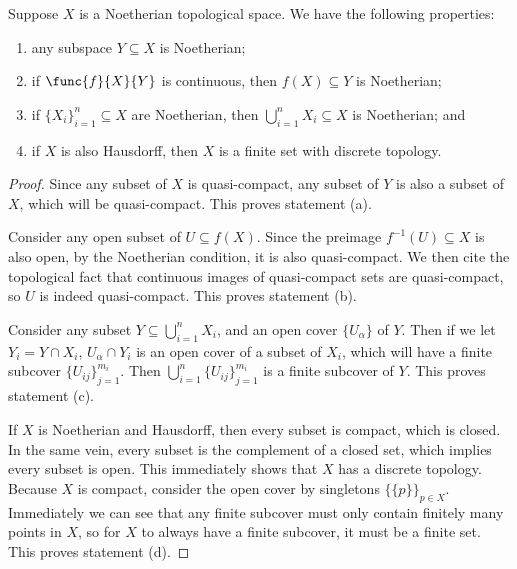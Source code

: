 \begin{proposition}
    Suppose \(X\) is a Noetherian topological space.
    We have the following properties:
    \begin{enumerate}[label={(\alph*)}, itemsep=0mm]
        \item any subspace \(Y \subseteq X\) is Noetherian;
        \item if \(\func{f}{X}{Y}\) is continuous, then \(f(X) \subseteq Y\) is Noetherian;
        \item if \({\{X_i\}}_{i=1}^n \subseteq X\) are Noetherian,
            then \(\bigcup_{i=1}^n X_i \subseteq X\) is Noetherian; and
        \item if \(X\) is also Hausdorff, then \(X\) is a finite set with discrete topology.
    \end{enumerate}
\end{proposition}
\begin{proof}
    Since any subset of \(X\) is quasi-compact,
    any subset of \(Y\) is also a subset of \(X\),
    which will be quasi-compact.
    This proves statement (a).

    Consider any open subset of \(U \subseteq f(X)\).
    Since the preimage \(f^{-1}(U) \subseteq X\) is also open,
    by the Noetherian condition,
    it is also quasi-compact.
    We then cite the topological fact that continuous images of quasi-compact sets are quasi-compact,
    so \(U\) is indeed quasi-compact.
    This proves statement (b).

    Consider any subset \(Y \subseteq \bigcup_{i=1}^n X_i\),
    and an open cover \(\{U_\alpha\}\) of \(Y\).
    Then if we let \(Y_i = Y \cap X_i\),
    \(U_\alpha \cap Y_i\) is an open cover of a subset of \(X_i\),
    which will have a finite subcover \({\{U_{ij}\}}_{j=1}^{m_i}\).
    Then \(\bigcup_{i=1}^n {\{U_{ij}\}}_{j=1}^{m_i}\) is a finite subcover of \(Y\).
    This proves statement (c).

    If \(X\) is Noetherian and Hausdorff,
    then every subset is compact, which is closed.
    In the same vein, every subset is the complement of a closed set,
    which implies every subset is open.
    This immediately shows that \(X\) has a discrete topology.
    Because \(X\) is compact, consider the open cover by singletons \({\{\{p\}\}}_{p \in X}\).
    Immediately we can see that any finite subcover must only contain finitely many points in \(X\),
    so for \(X\) to always have a finite subcover, it must be a finite set.
    This proves statement (d).
\end{proof}

